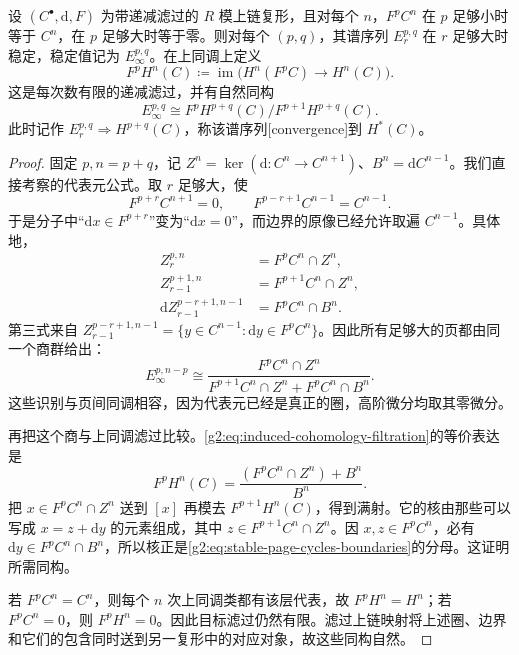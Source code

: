 \begin{theorem}\label{g2:thm:filtered-complex-convergence}
	设 \((C^\bullet,\mathrm d,F)\) 为带递减滤过的 \(R\) 模上链复形，且对每个 \(n\)，\(F^pC^n\) 在 \(p\) 足够小时等于 \(C^n\)，在 \(p\) 足够大时等于零。则对每个 \((p,q)\)，其谱序列 \(E_r^{p,q}\) 在 \(r\) 足够大时稳定，稳定值记为 \(E_\infty^{p,q}\)。在上同调上定义
	\begin{equation}\label{g2:eq:induced-cohomology-filtration}
		F^pH^n(C)\coloneqq\operatorname{im}\bigl(H^n(F^pC)\longrightarrow H^n(C)\bigr).
	\end{equation}
	这是每次数有限的递减滤过，并有自然同构
	\[
		E_\infty^{p,q}\cong F^pH^{p+q}(C)/F^{p+1}H^{p+q}(C).
	\]
	此时记作 \(E_r^{p,q}\Longrightarrow H^{p+q}(C)\)，称该谱序列[convergence]到 \(H^*(C)\)。
\end{theorem}
\begin{proof}
	固定 \(p,n=p+q\)，记 \(Z^n=\ker(\mathrm d:C^n\to C^{n+1})\)、\(B^n=\mathrm dC^{n-1}\)。我们直接考察的代表元公式。取 \(r\) 足够大，使
	\[
		F^{p+r}C^{n+1}=0,\qquad F^{p-r+1}C^{n-1}=C^{n-1}.
	\]
	于是分子中“\(\mathrm dx\in F^{p+r}\)”变为“\(\mathrm dx=0\)”，而边界的原像已经允许取遍 \(C^{n-1}\)。具体地，
	\[
		\begin{aligned}
			Z_r^{p,n}&=F^pC^n\cap Z^n,\\
			Z_{r-1}^{p+1,n}&=F^{p+1}C^n\cap Z^n,\\
			\mathrm d Z_{r-1}^{p-r+1,n-1}&=F^pC^n\cap B^n.
		\end{aligned}
	\]
	第三式来自 \(Z_{r-1}^{p-r+1,n-1}=\{y\in C^{n-1}:\mathrm dy\in F^pC^n\}\)。因此所有足够大的页都由同一个商群给出：
	\begin{equation}\label{g2:eq:stable-page-cycles-boundaries}
		E_\infty^{p,n-p}\cong
		\frac{F^pC^n\cap Z^n}{F^{p+1}C^n\cap Z^n+F^pC^n\cap B^n}.
	\end{equation}
	这些识别与页间同调相容，因为代表元已经是真正的圈，高阶微分均取其零微分。

	再把这个商与上同调滤过比较。\eqref{g2:eq:induced-cohomology-filtration}的等价表达是
	\[
		F^pH^n(C)=\frac{(F^pC^n\cap Z^n)+B^n}{B^n}.
	\]
	把 \(x\in F^pC^n\cap Z^n\) 送到 \([x]\) 再模去 \(F^{p+1}H^n(C)\)，得到满射。它的核由那些可以写成 \(x=z+\mathrm dy\) 的元素组成，其中 \(z\in F^{p+1}C^n\cap Z^n\)。因 \(x,z\in F^pC^n\)，必有 \(\mathrm dy\in F^pC^n\cap B^n\)，所以核正是\eqref{g2:eq:stable-page-cycles-boundaries}的分母。这证明所需同构。

	若 \(F^pC^n=C^n\)，则每个 \(n\) 次上同调类都有该层代表，故 \(F^pH^n=H^n\)；若 \(F^pC^n=0\)，则 \(F^pH^n=0\)。因此目标滤过仍然有限。滤过上链映射将上述圈、边界和它们的包含同时送到另一复形中的对应对象，故这些同构自然。
\end{proof}

